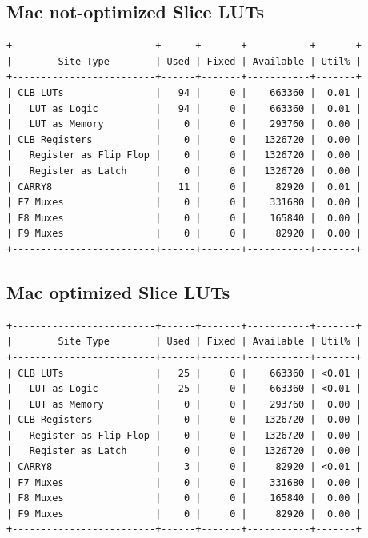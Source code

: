 \documentclass[11pt]{report}
\begin{document}
\subsection*{Mac not-optimized Slice LUTs}
\small
\begin{lstlisting}
+-------------------------+------+-------+-----------+-------+
|        Site Type        | Used | Fixed | Available | Util% |
+-------------------------+------+-------+-----------+-------+
| CLB LUTs                |   94 |     0 |    663360 |  0.01 |
|   LUT as Logic          |   94 |     0 |    663360 |  0.01 |
|   LUT as Memory         |    0 |     0 |    293760 |  0.00 |
| CLB Registers           |    0 |     0 |   1326720 |  0.00 |
|   Register as Flip Flop |    0 |     0 |   1326720 |  0.00 |
|   Register as Latch     |    0 |     0 |   1326720 |  0.00 |
| CARRY8                  |   11 |     0 |     82920 |  0.01 |
| F7 Muxes                |    0 |     0 |    331680 |  0.00 |
| F8 Muxes                |    0 |     0 |    165840 |  0.00 |
| F9 Muxes                |    0 |     0 |     82920 |  0.00 |
+-------------------------+------+-------+-----------+-------+
\end{lstlisting}

\subsection*{Mac optimized Slice LUTs}
\begin{lstlisting}
+-------------------------+------+-------+-----------+-------+
|        Site Type        | Used | Fixed | Available | Util% |
+-------------------------+------+-------+-----------+-------+
| CLB LUTs                |   25 |     0 |    663360 | <0.01 |
|   LUT as Logic          |   25 |     0 |    663360 | <0.01 |
|   LUT as Memory         |    0 |     0 |    293760 |  0.00 |
| CLB Registers           |    0 |     0 |   1326720 |  0.00 |
|   Register as Flip Flop |    0 |     0 |   1326720 |  0.00 |
|   Register as Latch     |    0 |     0 |   1326720 |  0.00 |
| CARRY8                  |    3 |     0 |     82920 | <0.01 |
| F7 Muxes                |    0 |     0 |    331680 |  0.00 |
| F8 Muxes                |    0 |     0 |    165840 |  0.00 |
| F9 Muxes                |    0 |     0 |     82920 |  0.00 |
+-------------------------+------+-------+-----------+-------+
\end{lstlisting}


\newpage
\end{document}
